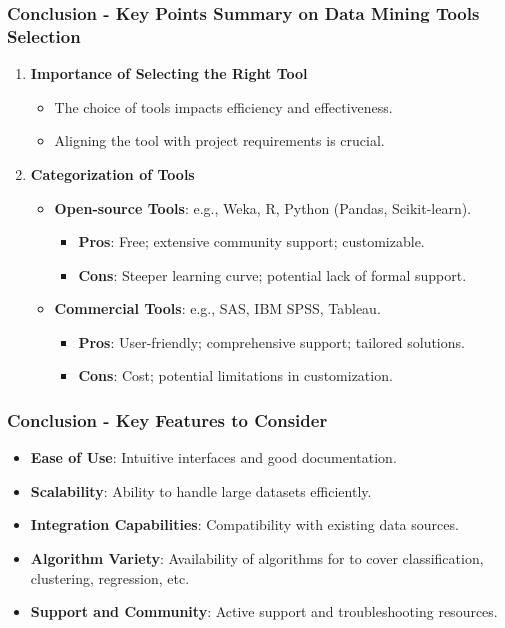 \documentclass[aspectratio=169]{beamer}
\begin{document}
\begin{frame}[fragile]
    \frametitle{Conclusion - Key Points Summary on Data Mining Tools Selection}
    
    \begin{enumerate}
        \item \textbf{Importance of Selecting the Right Tool}
        \begin{itemize}
            \item The choice of tools impacts efficiency and effectiveness.
            \item Aligning the tool with project requirements is crucial.
        \end{itemize}

        \item \textbf{Categorization of Tools}
        \begin{itemize}
            \item \textbf{Open-source Tools}: e.g., Weka, R, Python (Pandas, Scikit-learn).
            \begin{itemize}
                \item \textbf{Pros}: Free; extensive community support; customizable.
                \item \textbf{Cons}: Steeper learning curve; potential lack of formal support.
            \end{itemize}
            \item \textbf{Commercial Tools}: e.g., SAS, IBM SPSS, Tableau.
            \begin{itemize}
                \item \textbf{Pros}: User-friendly; comprehensive support; tailored solutions.
                \item \textbf{Cons}: Cost; potential limitations in customization.
            \end{itemize}
        \end{itemize}
    \end{enumerate}
\end{frame}

\begin{frame}[fragile]
    \frametitle{Conclusion - Key Features to Consider}
    
    \begin{itemize}
        \item \textbf{Ease of Use}: Intuitive interfaces and good documentation.
        \item \textbf{Scalability}: Ability to handle large datasets efficiently.
        \item \textbf{Integration Capabilities}: Compatibility with existing data sources.
        \item \textbf{Algorithm Variety}: Availability of algorithms for to cover classification, clustering, regression, etc.
        \item \textbf{Support and Community}: Active support and troubleshooting resources.
    \end{itemize}
\end{frame}
\end{document}
